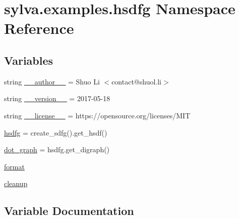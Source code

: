 \hypertarget{namespacesylva_1_1examples_1_1hsdfg}{}\section{sylva.\+examples.\+hsdfg Namespace Reference}
\label{namespacesylva_1_1examples_1_1hsdfg}
\subsection*{Variables}
\begin{DoxyCompactItemize}
\item 
string \hyperlink{namespacesylva_1_1examples_1_1hsdfg_a46dd54619ea0e999e4826a08e5c8e768}{\+\_\+\+\_\+author\+\_\+\+\_\+} = \textquotesingle{}Shuo Li $<$contact@shuol.\+li$>$\textquotesingle{}
\item 
string \hyperlink{namespacesylva_1_1examples_1_1hsdfg_a70abc328330b2dffb8da1ea4a6209a66}{\+\_\+\+\_\+version\+\_\+\+\_\+} = \textquotesingle{}2017-\/05-\/18\textquotesingle{}
\item 
string \hyperlink{namespacesylva_1_1examples_1_1hsdfg_ad5909dd8b7854afafa1e2624a2676e03}{\+\_\+\+\_\+license\+\_\+\+\_\+} = \textquotesingle{}https\+://opensource.\+org/licenses/M\+IT\textquotesingle{}
\item 
\hyperlink{namespacesylva_1_1examples_1_1hsdfg_a06352bdbd263f95950fdc8603fb107f0}{hsdfg} = create\+\_\+sdfg().get\+\_\+hsdf()
\item 
\hyperlink{namespacesylva_1_1examples_1_1hsdfg_ad7656c1716f521c19e144171ce7ba474}{dot\+\_\+graph} = hsdfg.\+get\+\_\+digraph()
\item 
\hyperlink{namespacesylva_1_1examples_1_1hsdfg_ab3510a0b8457362330aa4d9fd2209590}{format}
\item 
\hyperlink{namespacesylva_1_1examples_1_1hsdfg_a1956fa67dabc367c8f84fe003a8b7d62}{cleanup}
\end{DoxyCompactItemize}


\subsection{Variable Documentation}
\mbox{\label{namespacesylva_1_1examples_1_1hsdfg_a46dd54619ea0e999e4826a08e5c8e768}} 
